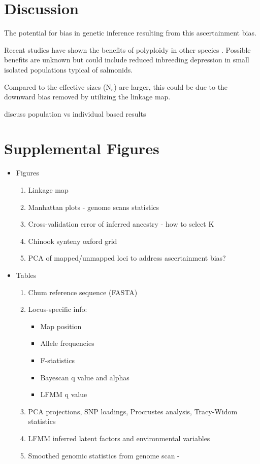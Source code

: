\documentclass[12pt, one column]{article}
\begin{document}
\section*{Discussion}

The potential for bias in genetic inference resulting from this ascertainment bias.

Recent studies have shown the benefits of polyploidy in other species \citep{Selmecki2015}.  Possible benefits are unknown but could include reduced inbreeding depression in small isolated populations typical of salmonids.

Compared to \citet{Small2014} the effective sizes (N$_{e}$) are larger, this could be due to the downward bias removed by utilizing the linkage map.

discuss population vs individual based results



\pagebreak
\section*{Supplemental Figures}
\begin{itemize}
\item Figures
    	\begin{enumerate}
        \item Linkage map
        \item Manhattan plots - genome scans statistics
        \item Cross-validation error of inferred ancestry  - how to select K
        \item Chinook synteny oxford grid
        \item PCA of mapped/unmapped loci to address ascertainment bias?
		\end{enumerate}
\item Tables
    	\begin{enumerate}
        \item Chum reference sequence (FASTA)
        \item Locus-specific info: 
        	\begin{itemize}
            \item Map position
            \item Allele frequencies
            \item F-statistics
            \item Bayescan q value and alphas
            \item LFMM q value
            \end{itemize}
        \item PCA projections, SNP loadings, Procrustes analysis, Tracy-Widom statistics
        \item LFMM inferred latent factors and environmental variables
        \item Smoothed genomic statistics from genome scan - 
        \end{enumerate}
\end{itemize}
\end{document}
